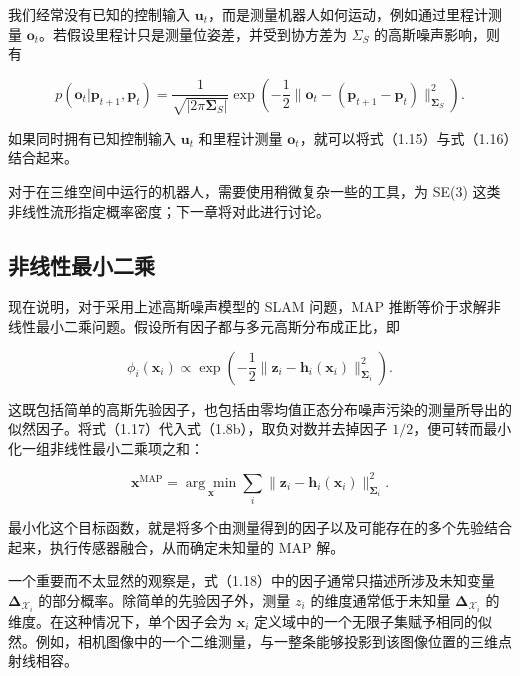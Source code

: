 我们经常没有已知的控制输入 $\pmb u_t$，而是测量机器人如何运动，例如通过里程计测量 $\pmb o_t$。若假设里程计只是测量位姿差，并受到协方差为 $\Sigma_S$ 的高斯噪声影响，则有

\begin{equation}
p (\boldsymbol {o} _ {t} | \boldsymbol {p} _ {t + 1}, \boldsymbol {p} _ {t}) = \frac {1}{\sqrt {| 2 \pi \boldsymbol {\Sigma} _ {S} |}} \exp \left(- \frac {1}{2} \| \boldsymbol {o} _ {t} - (\boldsymbol {p} _ {t + 1} - \boldsymbol {p} _ {t}) \| _ {\boldsymbol {\Sigma} _ {S}} ^ {2}\right).\tag{1.16}
\end{equation}

如果同时拥有已知控制输入 $\pmb u_t$ 和里程计测量 $\pmb o_t$，就可以将式（1.15）与式（1.16）结合起来。

对于在三维空间中运行的机器人，需要使用稍微复杂一些的工具，为 SE(3) 这类非线性流形指定概率密度；下一章将对此进行讨论。

\subsection{非线性最小二乘}

现在说明，对于采用上述高斯噪声模型的 SLAM 问题，MAP 推断等价于求解非线性最小二乘问题。假设所有因子都与多元高斯分布成正比，即

\begin{equation}
\phi_ {i} (\boldsymbol {x} _ {i}) \propto \exp \left(- \frac {1}{2} \| \boldsymbol {z} _ {i} - \boldsymbol {h} _ {i} (\boldsymbol {x} _ {i}) \| _ {\boldsymbol {\Sigma} _ {i}} ^ {2}\right).\tag{1.17}
\end{equation}

这既包括简单的高斯先验因子，也包括由零均值正态分布噪声污染的测量所导出的似然因子。将式（1.17）代入式（1.8b），取负对数并去掉因子 $1/2$，便可转而最小化一组非线性最小二乘项之和：

\begin{equation}
\boldsymbol {x} ^ {\mathrm{MAP}} = \underset {\boldsymbol {x}} {\arg \min} \sum_ {i} \| \boldsymbol {z} _ {i} - \boldsymbol {h} _ {i} (\boldsymbol {x} _ {i}) \| _ {\boldsymbol {\Sigma} _ {i}} ^ {2}.\tag{1.18}
\end{equation}

最小化这个目标函数，就是将多个由测量得到的因子以及可能存在的多个先验结合起来，执行传感器融合，从而确定未知量的 MAP 解。

一个重要而不太显然的观察是，式（1.18）中的因子通常只描述所涉及未知变量 $\boldsymbol\Delta_{\boldsymbol{\mathcal{X}}_i}$ 的部分概率。除简单的先验因子外，测量 $z_i$ 的维度通常低于未知量 $\boldsymbol\Delta_{\boldsymbol{\mathcal{X}}_i}$ 的维度。在这种情况下，单个因子会为 $\pmb x_i$ 定义域中的一个无限子集赋予相同的似然。例如，相机图像中的一个二维测量，与一整条能够投影到该图像位置的三维点射线相容。

